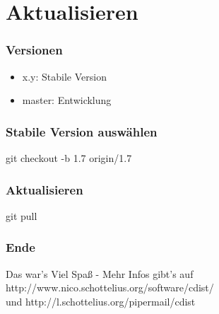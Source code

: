 \documentclass{beamer}
\begin{document}
\section{Aktualisieren}
\begin{frame}[fragile]
  \frametitle{Versionen}
  \begin{itemize}[<+->]
     \item x.y: Stabile Version
     \item master: Entwicklung
  \end{itemize}
\end{frame}

\begin{frame}[fragile]
  \frametitle{Stabile Version auswählen}
  \begin{center}
  git checkout -b 1.7 origin/1.7
  \end{center}
\end{frame}

\begin{frame}[fragile]
  \frametitle{Aktualisieren}
  \begin{center}
  git pull
  \end{center}
\end{frame}

\frame
{
  \frametitle{Ende}
  \begin{block}{Das war's}
  Viel Spaß - Mehr Infos gibt's auf http://www.nico.schottelius.org/software/cdist/\\
  und http://l.schottelius.org/pipermail/cdist
  \end{block}
}
\end{document}
